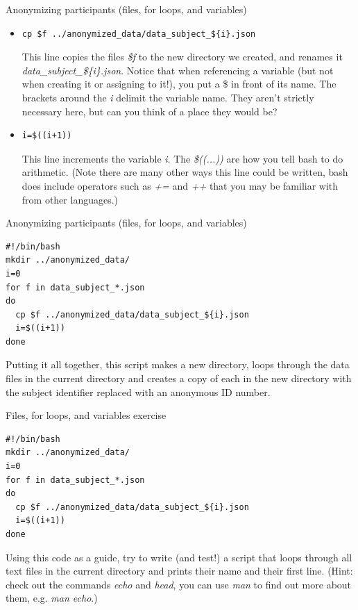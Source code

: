 \documentclass{beamer}
\begin{document}
\begin{frame}[fragile]{Anonymizing participants (files, for loops, and variables)}
\begin{itemize}
\item<1->
\begin{lstlisting}
cp $f ../anonymized_data/data_subject_${i}.json
\end{lstlisting} 
This line copies the files \emph{\$f} to the new directory we created, and renames it \emph{data\_subject\_\$\{i\}.json}. Notice that when referencing a variable (\alert{but not when creating it or assigning to it!}), you put a \$ in front of its name. The brackets around the \emph{i} delimit the variable name. They aren't strictly necessary here, but can you think of a place they would be?
\item<2->
\begin{lstlisting}
i=$((i+1))
\end{lstlisting} 
This line increments the variable \emph{i}. The \emph{\$((...))} are how you tell bash to do arithmetic. (Note there are many other ways this line could be written, bash does include operators such as \emph{+=} and \emph{++} that you may be familiar with from other languages.)
\end{itemize}
\end{frame}

\begin{frame}[fragile]{Anonymizing participants (files, for loops, and variables)}
\begin{lstlisting}[title=anonymize.sh]
#!/bin/bash
mkdir ../anonymized_data/
i=0
for f in data_subject_*.json
do
  cp $f ../anonymized_data/data_subject_${i}.json
  i=$((i+1))
done
\end{lstlisting}
Putting it all together, this script makes a new directory, loops through the data files in the current directory and creates a copy of each in the new directory with the subject identifier replaced with an anonymous ID number.
\end{frame}

\begin{frame}[fragile]{Files, for loops, and variables exercise}
\begin{lstlisting}[title=anonymize.sh]
#!/bin/bash
mkdir ../anonymized_data/
i=0
for f in data_subject_*.json
do
  cp $f ../anonymized_data/data_subject_${i}.json
  i=$((i+1))
done
\end{lstlisting}
Using this code as a guide, try to write (and test!) a script that loops through all text files in the current directory and prints their name and their first line. (Hint: check out the commands \emph{echo} and \emph{head}, you can use \emph{man} to find out more about them, e.g. \emph{man echo}.) 
\end{frame}
\end{document}
